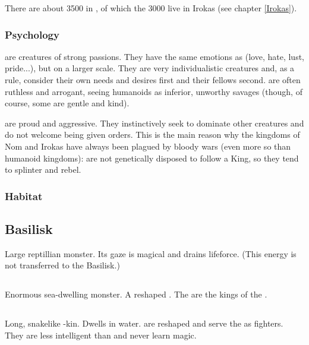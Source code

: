 There are about 3500 \dragons{} in \KnownWorld{}, of which the 3000 live in Irokas (see chapter \ref{Irokas}). 

\subsubsection{Psychology}
\Dragons{} are creatures of strong passions. They have the same emotions as \humans{} (love, hate, lust, pride...), but on a larger scale. They are very individualistic creatures and, as a rule, consider their own needs and desires first and their fellows second.	\Dragons{} are often ruthless and arrogant, seeing humanoids as inferior, unworthy savages (though, of course, some \dragons{} are gentle and kind). 

\Dragons{} are proud and aggressive. They instinctively seek to dominate other creatures and do not welcome being given orders. This is the main reason why the \draconic{} kingdoms of Nom and Irokas have always been plagued by bloody wars (even more so than humanoid kingdoms): \Dragons{} are not genetically disposed to follow a King, so they tend to splinter and rebel. 

\subsubsection{Habitat}



\subsection{Basilisk}
Large reptillian monster. Its gaze is magical and drains lifeforce. (This energy is not transferred to the Basilisk.) 



\subsection{\Leviathan}
Enormous sea-dwelling monster. A reshaped \naga{}. The \Leviathans{} are the kings of the \nagae{}. 



\subsection{\Linnorm}
Long, snakelike \dragon-kin. Dwells in water. \Linnorms{} are reshaped \nagae{} and serve the \leviathans{} as fighters. They are less intelligent than \nagae{} and never learn magic. 



